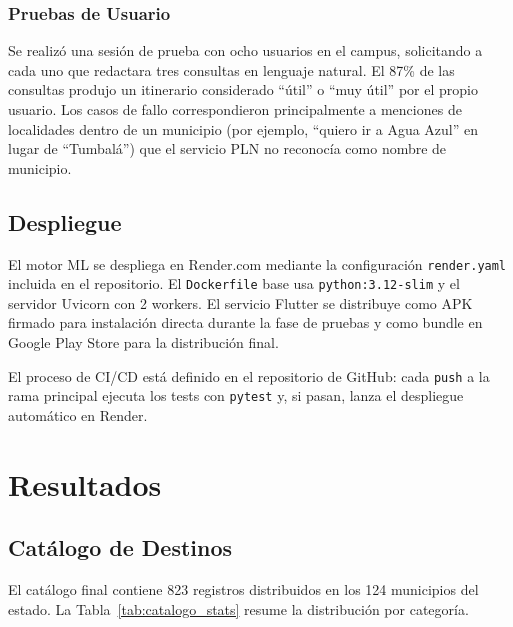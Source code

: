 \documentclass[12pt,letterpaper]{report}
\begin{document}
\subsection{Pruebas de Usuario}

Se realizó una sesión de prueba con ocho usuarios en el campus, solicitando a cada uno que
redactara tres consultas en lenguaje natural. El 87\% de las consultas produjo un itinerario
considerado ``útil'' o ``muy útil'' por el propio usuario. Los casos de fallo correspondieron
principalmente a menciones de localidades dentro de un municipio (por ejemplo, ``quiero ir
a Agua Azul'' en lugar de ``Tumbalá'') que el servicio PLN no reconocía como nombre de
municipio.

\section{Despliegue}

El motor ML se despliega en Render.com mediante la configuración \texttt{render.yaml} incluida
en el repositorio. El \texttt{Dockerfile} base usa \texttt{python:3.12-slim} y el servidor
Uvicorn con 2 workers. El servicio Flutter se distribuye como APK firmado para instalación
directa durante la fase de pruebas y como bundle en Google Play Store para la distribución
final.

El proceso de CI/CD está definido en el repositorio de GitHub: cada \texttt{push} a la rama
principal ejecuta los tests con \texttt{pytest} y, si pasan, lanza el despliegue automático
en Render.

\chapter{Resultados}

\section{Catálogo de Destinos}

El catálogo final contiene 823 registros distribuidos en los 124 municipios del estado.
La Tabla~\ref{tab:catalogo_stats} resume la distribución por categoría.
\end{document}
